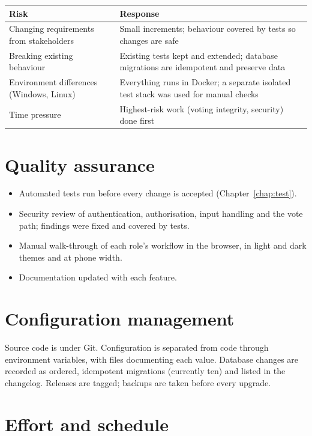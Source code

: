\begin{center}
\small
\begin{tabularx}{\linewidth}{@{}>{\raggedright}p{4.2cm} X@{}}
\toprule
\textbf{Risk} & \textbf{Response} \\
\midrule
Changing requirements from stakeholders & Small increments; behaviour covered by tests so changes are safe \\
Breaking existing behaviour & Existing tests kept and extended; database migrations are idempotent and preserve data \\
Environment differences (Windows, Linux) & Everything runs in Docker; a separate isolated test stack was used for manual checks \\
Time pressure & Highest-risk work (voting integrity, security) done first \\
\bottomrule
\end{tabularx}
\end{center}

\section{Quality assurance}

\begin{itemize}
  \item Automated tests run before every change is accepted (Chapter~\ref{chap:test}).
  \item Security review of authentication, authorisation, input handling and the vote path; findings were fixed and covered by tests.
  \item Manual walk-through of each role's workflow in the browser, in light and dark themes and at phone width.
  \item Documentation updated with each feature.
\end{itemize}

\section{Configuration management}

Source code is under Git. Configuration is separated from code through environment variables, with  files documenting each value. Database changes are recorded as ordered, idempotent migrations (currently ten) and listed in the changelog. Releases are tagged; backups are taken before every upgrade.

\section{Effort and schedule}

